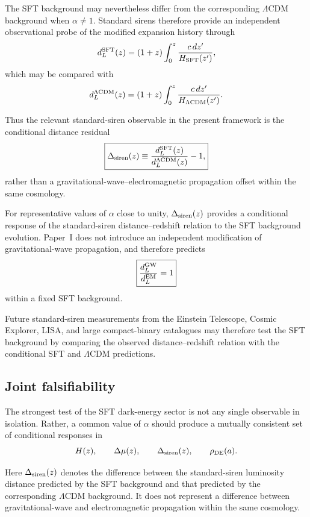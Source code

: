 \documentclass[12pt]{article}
\begin{document}
The SFT background may nevertheless differ from the corresponding
$\Lambda$CDM background when $\alpha\neq1$. Standard sirens therefore
provide an independent observational probe of the modified expansion
history through
\begin{equation}
d_L^{\rm SFT}(z)
=
(1+z)
\int_0^z
\frac{c\,dz'}{H_{\rm SFT}(z')},
\end{equation}
which may be compared with
\begin{equation}
d_L^{\Lambda{\rm CDM}}(z)
=
(1+z)
\int_0^z
\frac{c\,dz'}{H_{\Lambda{\rm CDM}}(z')}.
\end{equation}

Thus the relevant standard-siren observable in the present framework is
the conditional distance residual
\begin{equation}
\boxed{
\Delta_{\rm siren}(z)
\equiv
\frac{d_L^{\rm SFT}(z)}
     {d_L^{\Lambda{\rm CDM}}(z)}
-1,
}
\end{equation}
rather than a gravitational-wave--electromagnetic propagation offset
within the same cosmology.

For representative values of $\alpha$ close to unity,
$\Delta_{\rm siren}(z)$ provides a conditional response of the
standard-siren distance--redshift relation to the SFT background
evolution. Paper~I does not introduce an independent modification of
gravitational-wave propagation, and therefore predicts
\[
\boxed{
\frac{d_L^{\rm GW}}{d_L^{\rm EM}}=1
}
\]
within a fixed SFT background.

Future standard-siren measurements from the Einstein Telescope,
Cosmic Explorer, LISA, and large compact-binary catalogues may therefore
test the SFT background by comparing the observed distance--redshift
relation with the conditional SFT and $\Lambda$CDM predictions.


\subsection{Joint falsifiability}

The strongest test of the SFT dark-energy sector is not any single
observable in isolation. Rather, a common value of $\alpha$ should
produce a mutually consistent set of conditional responses in
\[
H(z),\qquad
\Delta\mu(z),\qquad
\Delta_{\rm siren}(z),\qquad
\rho_{\rm DE}(a).
\]

Here $\Delta_{\rm siren}(z)$ denotes the difference between the
standard-siren luminosity distance predicted by the SFT background and
that predicted by the corresponding $\Lambda$CDM background. It does
not represent a difference between gravitational-wave and
electromagnetic propagation within the same cosmology.
\end{document}
